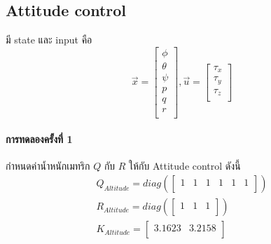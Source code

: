\subsection{Attitude control}
มี state และ input คือ
\begin{equation}
    {\vec{x}=\begin{bmatrix}
        \phi \\ \theta \\ \psi \\ p \\ q \\ r \\
    \end{bmatrix}, \vec{u} = \begin{bmatrix}
        \tau_x \\ \tau_y \\ \tau_z \\
    \end{bmatrix}}
\end{equation}

\paragraph*{การทดลองครั้งที่ 1}
กำหนดค่าน้ำหนักเมทริก $Q$ กับ $R$ ให้กับ Attitude control ดังนี้
\begin{equation}
    \begin{array}{c}
    {Q_{Altitude}=diag(\begin{bmatrix}
        1 & 1 & 1 & 1 & 1 & 1\\
    \end{bmatrix})}\\[10pt]
    {R_{Altitude} = diag(\begin{bmatrix}
        1 & 1 & 1\\
    \end{bmatrix})}\\[10pt]
    {K_{Altitude} = \begin{bmatrix}
        3.1623 & 3.2158 \\
    \end{bmatrix}} \\[10pt]
    \end{array}
\end{equation}